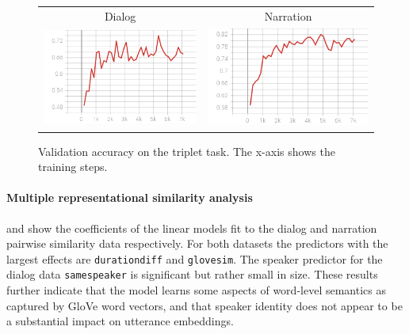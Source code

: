 \begin{figure}
  \centering
  \begin{tabular}{cc}
    Dialog & Narration \\
    \includegraphics[scale=0.3]{val_acc3.png}  & \includegraphics[scale=0.3]{valnarr_acc3.png}\\
  \end{tabular}
  \caption{Validation accuracy on the triplet task. The x-axis shows
    the training steps.}
  \label{fig:triplet}
\end{figure}

\paragraph{Multiple representational similarity analysis}
 and  show the coefficients
of the linear models fit to the dialog and narration pairwise
similarity data respectively. For both datasets the predictors with
the largest effects are {\tt durationdiff} and {\tt glovesim}. The
speaker predictor for the dialog data {\tt samespeaker} is significant
but rather small in size. These results further indicate that the
model learns some aspects of word-level semantics as captured by GloVe
word vectors, and that speaker identity does not appear to be a
substantial impact on utterance embeddings.

